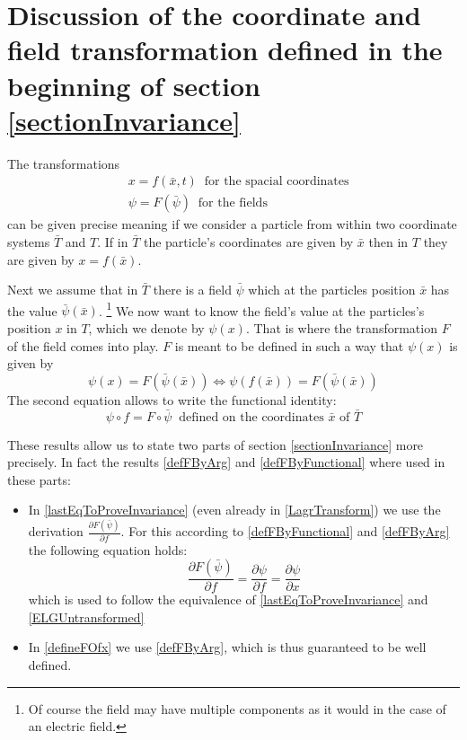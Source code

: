 \documentclass{article}
\begin{document}
\appendix

\section{Discussion of the coordinate and field transformation defined in the beginning of section \ref{sectionInvariance}} \label{appendixDiscussionTransform}
The transformations
\begin{align}
  &x=f(\bar{x},t) \;\; \text{for the spacial coordinates}\\
  &\psi=F(\bar{\psi}) \;\; \text{for the fields}
\end{align}
can be given precise meaning if we consider a particle from within two coordinate systems $\bar{T}$ and $T$.
If in $\bar{T}$ the particle's coordinates are given by $\bar{x}$ then in $T$ they are given by $x = f(\bar{x})$.

Next we assume that in $\bar{T}$ there is a field $\bar{\psi}$ which at the particles position $\bar{x}$ has the value $\bar{\psi}(\bar{x})$.
\footnote{Of course the field may have multiple components as it would in the case of an electric field.}
We now want to know the field's value at the particles's position $x$ in $T$, which we denote by $\psi(x)$.
That is where the transformation $F$ of the field comes into play.
$F$ is meant to be defined in such a way that $\psi(x)$ is given by
\begin{equation} \label{defFByArg}
  \psi(x) = F(\bar{\psi}(\bar{x})) \iff \psi(f(\bar{x})) = F(\bar{\psi}(\bar{x}))
\end{equation}
The second equation allows to write the functional identity:
\begin{equation} \label{defFByFunctional}
  \psi \circ f = F \circ \bar{\psi} \;\; \text{defined on the coordinates $\bar{x}$ of $\bar{T}$}
\end{equation}


These results allow us to state two parts of section \ref{sectionInvariance} more precisely.
In fact the results \ref{defFByArg} and \ref{defFByFunctional} where used in these parts:
\begin{itemize}
  \item
  In \ref{lastEqToProveInvariance} (even already in \ref{LagrTransform}) we use the derivation $\frac{\partial F(\bar{\psi})}{\partial f}$.
  For this according to \ref{defFByFunctional} and \ref{defFByArg} the following equation holds:
  \begin{equation}
    \frac{\partial F(\bar{\psi})}{\partial f} = \frac{\partial \psi}{\partial f} = \frac{\partial \psi}{\partial x}
  \end{equation}
  which is used to follow the equivalence of \ref{lastEqToProveInvariance} and \ref{ELGUntransformed}
  \item
  In \ref{defineFOfx} we use \ref{defFByArg}, which is thus guaranteed to be well defined.
\end{itemize}
\end{document}
